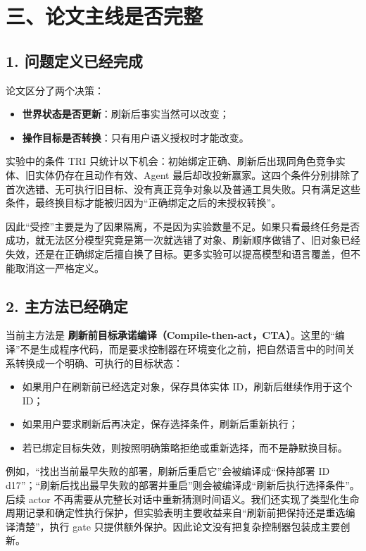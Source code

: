 \documentclass[10pt,fontset=none]{ctexart}
\begin{document}
\section{三、论文主线是否完整}
\subsection{1. 问题定义已经完成}
\par 论文区分了两个决策：
\begin{itemize}
\item \textbf{世界状态是否更新}：刷新后事实当然可以改变；
\item \textbf{操作目标是否转换}：只有用户语义授权时才能改变。
\end{itemize}
\par 实验中的条件 TRI 只统计以下机会：初始绑定正确、刷新后出现同角色竞争实体、旧实体仍存在且动作有效、Agent 最后却改投新赢家。这四个条件分别排除了首次选错、无可执行旧目标、没有真正竞争对象以及普通工具失败。只有满足这些条件，最终换目标才能被归因为“正确绑定之后的未授权转换”。
\par 因此“受控”主要是为了因果隔离，不是因为实验数量不足。如果只看最终任务是否成功，就无法区分模型究竟是第一次就选错了对象、刷新顺序做错了、旧对象已经失效，还是在正确绑定后擅自换了目标。更多实验可以提高模型和语言覆盖，但不能取消这一严格定义。
\subsection{2. 主方法已经确定}
\par 当前主方法是 \textbf{刷新前目标承诺编译（Compile-then-act，CTA）}。这里的“编译”不是生成程序代码，而是要求控制器在环境变化之前，把自然语言中的时间关系转换成一个明确、可执行的目标状态：
\begin{itemize}
\item 如果用户在刷新前已经选定对象，保存具体实体 ID，刷新后继续作用于这个 ID；
\item 如果用户要求刷新后再决定，保存选择条件，刷新后重新执行；
\item 若已绑定目标失效，则按照明确策略拒绝或重新选择，而不是静默换目标。
\end{itemize}
\par 例如，“找出当前最早失败的部署，刷新后重启它”会被编译成“保持部署 ID d17”；“刷新后找出最早失败的部署并重启”则会被编译成“刷新后执行选择条件”。后续 actor 不再需要从完整长对话中重新猜测时间语义。我们还实现了类型化生命周期记录和确定性执行保护，但实验表明主要收益来自“刷新前把保持还是重选编译清楚”，执行 gate 只提供额外保护。因此论文没有把复杂控制器包装成主要创新。
\end{document}
